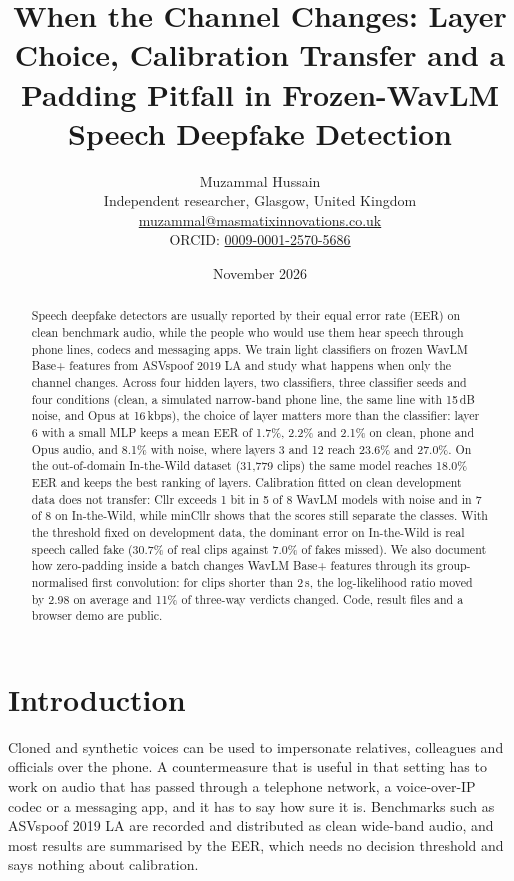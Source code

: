 \documentclass[10pt,a4paper]{article}
\title{When the Channel Changes: Layer Choice, Calibration Transfer and a Padding Pitfall in Frozen-WavLM Speech Deepfake Detection}
\author{Muzammal Hussain\\
\small Independent researcher, Glasgow, United Kingdom\\
\small \href{mailto:muzammal@masmatixinnovations.co.uk}{muzammal@masmatixinnovations.co.uk}\\
\small ORCID: \href{https://orcid.org/0009-0001-2570-5686}{0009-0001-2570-5686}}
\date{\small November 2026}
\begin{document}
\maketitle

\begin{abstract}
Speech deepfake detectors are usually reported by their equal error rate (EER) on clean benchmark audio, while the
people who would use them hear speech through phone lines, codecs and messaging apps. We train light classifiers on
frozen WavLM Base+ features from ASVspoof 2019 LA and study what happens when only the channel changes. Across four
hidden layers, two classifiers, three classifier seeds and four conditions (clean, a simulated narrow-band phone
line, the same line with 15\,dB noise, and Opus at 16\,kbps), the choice of layer matters more than the classifier:
layer 6 with a small MLP keeps a mean EER of 1.7\%, 2.2\% and 2.1\% on clean, phone and Opus audio, and 8.1\% with
noise, where layers 3 and 12 reach 23.6\% and 27.0\%. On the out-of-domain In-the-Wild dataset (31,779 clips) the
same model reaches 18.0\% EER and keeps the best ranking of layers. Calibration fitted on clean development data does
not transfer: Cllr exceeds 1 bit in 5 of 8 WavLM models with noise and in 7 of 8 on In-the-Wild, while minCllr shows
that the scores still separate the classes. With the threshold fixed on development data, the dominant error on
In-the-Wild is real speech called fake (30.7\% of real clips against 7.0\% of fakes missed). We also document how
zero-padding inside a batch changes WavLM Base+ features through its group-normalised first convolution: for clips
shorter than 2\,s, the log-likelihood ratio moved by 2.98 on average and 11\% of three-way verdicts changed. Code,
result files and a browser demo are public.
\end{abstract}

\section{Introduction}
Cloned and synthetic voices can be used to impersonate relatives, colleagues and officials over the phone. A
countermeasure that is useful in that setting has to work on audio that has passed through a telephone network, a
voice-over-IP codec or a messaging app, and it has to say how sure it is. Benchmarks such as ASVspoof 2019 LA
\cite{wang2020asvspoof} are recorded and distributed as clean wide-band audio, and most results are summarised by the
EER, which needs no decision threshold and says nothing about calibration.
\end{document}
